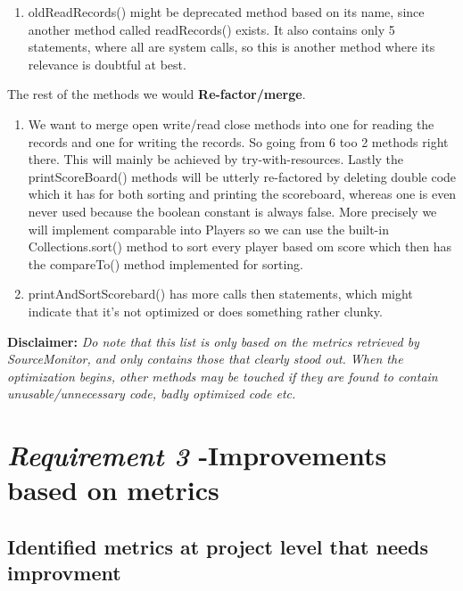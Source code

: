 \documentclass{article}
\begin{document}
\begin{enumerate}
\begin{enumerate}
\item
oldReadRecords() might be deprecated method based on its name, since another method called readRecords() exists. It also contains only 5 statements, where all are system calls, so this is another method where its relevance is doubtful at best.
\end{enumerate}
\vspace{0.4cm}
The rest of the methods we would \textbf{Re-factor/merge}.
\vspace{0.2cm}
\begin{enumerate}
\item
We want to merge open write/read close methods into one for
reading the records and one for writing the records. So going from 6
too 2 methods right there. This will mainly be achieved by try-with-resources.
Lastly the printScoreBoard() methods will be utterly re-factored by deleting
double code which it has for both sorting and printing the scoreboard, whereas one is even never used because the boolean constant is always false. More precisely we will implement comparable into Players so we can use the built-in Collections.sort() method to sort every player based om score which then has the compareTo() method implemented for sorting.

\item
printAndSortScorebard() has more calls then statements, which might indicate that it's not optimized or does something rather clunky.

\end{enumerate}

\textbf{Disclaimer:} \hspace{0.2cm} 
\textit{Do note that this list is only based on the metrics retrieved by SourceMonitor, and only contains those that clearly stood out. When the optimization begins, other methods may be touched if they are found to contain unusable/unnecessary code, badly optimized code etc.}

\end{enumerate}



\section{\textit{Requirement 3} -Improvements based on metrics}

\subsection{Identified metrics at project level that needs improvment}
\end{document}
